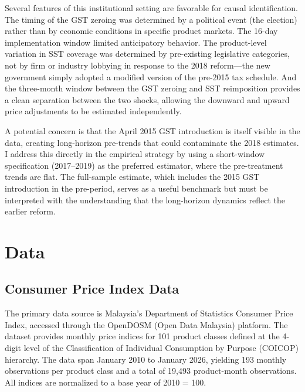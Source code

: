 \documentclass[12pt]{article}
\begin{document}
Several features of this institutional setting are favorable for causal identification. The timing of the GST zeroing was determined by a political event (the election) rather than by economic conditions in specific product markets. The 16-day implementation window limited anticipatory behavior. The product-level variation in SST coverage was determined by pre-existing legislative categories, not by firm or industry lobbying in response to the 2018 reform---the new government simply adopted a modified version of the pre-2015 tax schedule. And the three-month window between the GST zeroing and SST reimposition provides a clean separation between the two shocks, allowing the downward and upward price adjustments to be estimated independently.

A potential concern is that the April 2015 GST introduction is itself visible in the data, creating long-horizon pre-trends that could contaminate the 2018 estimates. I address this directly in the empirical strategy by using a short-window specification (2017--2019) as the preferred estimator, where the pre-treatment trends are flat. The full-sample estimate, which includes the 2015 GST introduction in the pre-period, serves as a useful benchmark but must be interpreted with the understanding that the long-horizon dynamics reflect the earlier reform.


\section{Data}

\subsection{Consumer Price Index Data}

The primary data source is Malaysia's Department of Statistics Consumer Price Index, accessed through the OpenDOSM (Open Data Malaysia) platform. The dataset provides monthly price indices for 101 product classes defined at the 4-digit level of the Classification of Individual Consumption by Purpose (COICOP) hierarchy. The data span January 2010 to January 2026, yielding 193 monthly observations per product class and a total of 19,493 product-month observations. All indices are normalized to a base year of 2010 = 100.
\end{document}
